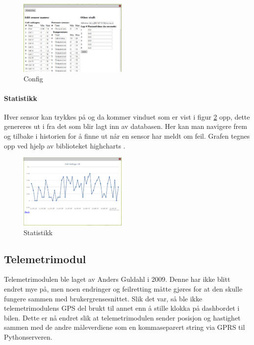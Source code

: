 \begin{figure}[H]
\includegraphics[width=200px]{images/config.png}
\caption{Config}
\label{fig:config}
\end{figure}

\paragraph{Statistikk}
Hver sensor kan trykkes på og da kommer vinduet som er vist i figur \ref{fig:stats} opp, dette genereres ut i fra det som blir lagt inn av databasen. Her kan man navigere frem og tilbake i historien for å finne ut når en sensor har meldt om feil. Grafen tegnes opp ved hjelp av biblioteket highcharts \cite{highcharts}.

\begin{figure}[H]
\includegraphics[width=200px]{images/stat.png}
\caption{Statistikk}
\label{fig:stats}
\end{figure}

\subsection{Telemetrimodul}
Telemetrimodulen ble laget av Anders Guldahl \cite{telemetrithesis} i 2009. Denne har ikke blitt endret mye på, men noen endringer og feilretting måtte gjøres for at den skulle fungere sammen med brukergrensesnittet.
Slik det var, så ble ikke telemetrimodulens GPS del brukt til annet enn å stille klokka på dashbordet i bilen. Dette er nå endret slik at telemetrimodulen sender posisjon og hastighet sammen med de andre måleverdiene som en kommaseparert string via GPRS til Pythonserveren.
